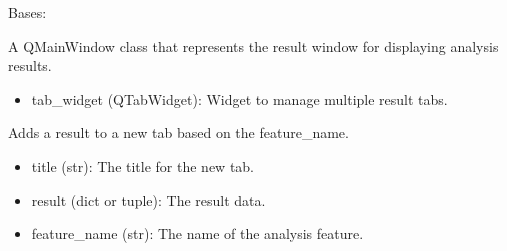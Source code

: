 \documentclass[a4paper,10pt,english]{sphinxmanual}
\begin{document}
\begin{fulllineitems}
\label{\detokenize{gui:src.gui.result_window.ResultWindow}}
\pysigstartsignatures
{}
\pysigstopsignatures
\sphinxAtStartPar
Bases: 

\sphinxAtStartPar
A QMainWindow class that represents the result window for displaying analysis results.
\begin{description}
\begin{itemize}
\item {} 
\sphinxAtStartPar
tab\_widget (QTabWidget): Widget to manage multiple result tabs.

\end{itemize}

\end{description}

\begin{fulllineitems}
\label{\detokenize{gui:src.gui.result_window.ResultWindow.add_result}}
\pysigstartsignatures
{}
\pysigstopsignatures
\sphinxAtStartPar
Adds a result to a new tab based on the feature\_name.
\begin{description}
\begin{itemize}
\item {} 
\sphinxAtStartPar
title (str): The title for the new tab.

\item {} 
\sphinxAtStartPar
result (dict or tuple): The result data.

\item {} 
\sphinxAtStartPar
feature\_name (str): The name of the analysis feature.

\end{itemize}

\end{description}

\end{fulllineitems}


\end{fulllineitems}
\end{document}
